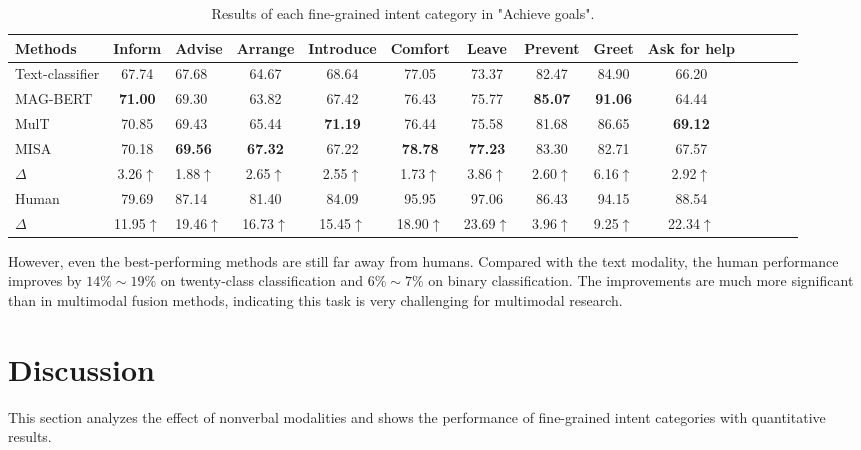 \documentclass[sigconf,camera-ready]{acmart}
\begin{document}
\begin{table*}\small
		\caption{\label{goal_results_each_class} Results of each fine-grained intent category in "Achieve goals".
	}
	\renewcommand\tabcolsep{3pt} 
	\centering
		\begin{tabular*}{\textwidth}{l|c@{\extracolsep{\fill}}lccccccccccc} 
		\midrule
		Methods & Inform  &Advise & Arrange & Introduce & Comfort & Leave & Prevent & Greet & Ask for help\\
		\midrule
		\multicolumn{1}{l|}{Text-classifier}  & 67.74 & 67.68 & 64.67 & 68.64 & 77.05 & 73.37 & 82.47 & 84.90 & 66.20   \\
		\midrule
		\multicolumn{1}{l|}{MAG-BERT}  & \textbf{71.00} & 69.30 & 63.82 & 67.42 & 76.43 & 75.77 & \textbf{85.07} & \textbf{91.06} & 64.44 \\
		\multicolumn{1}{l|}{MulT}  & 
        70.85 & 69.43 & 65.44 & \textbf{71.19} & 76.44 & 75.58 & 81.68 & 86.65 & \textbf{69.12} \\
		\multicolumn{1}{l|}{MISA} & 
		70.18 & \textbf{69.56} & \textbf{67.32} & 67.22 & \textbf{78.78} & \textbf{77.23} & 83.30 & 82.71 & 67.57   \\
		\multicolumn{1}{l|}{$\Delta$} & 3.26$\uparrow$ & 1.88$\uparrow$ & 2.65$\uparrow$ & 2.55$\uparrow$ & 1.73$\uparrow$ & 3.86$\uparrow$ & 2.60$\uparrow$ & 6.16$\uparrow$ & 2.92$\uparrow$ \\
		\midrule
		\multicolumn{1}{l|}{Human}  & 79.69 & 87.14 & 81.40 & 84.09 & 95.95 & 97.06 & 86.43 & 94.15 & 88.54 \\
		\multicolumn{1}{l|}{$\Delta$}  & 11.95$\uparrow$ & 19.46$\uparrow$ & 16.73$\uparrow$ & 15.45$\uparrow$ & 18.90$\uparrow$ & 23.69$\uparrow$ & 3.96$\uparrow$ & 9.25$\uparrow$ & 22.34$\uparrow$ \\
		\bottomrule
	\end{tabular*}
\end{table*}

However, even the best-performing methods are still far away from humans. Compared with the text modality, the human performance improves by $14\%\sim19\%$ on twenty-class classification and $6\%\sim7\%$ on binary classification. The improvements are much more significant than in multimodal fusion methods, indicating this task is very challenging for multimodal research. 


\section{Discussion}
This section analyzes the effect of nonverbal modalities and shows the performance of fine-grained intent categories with quantitative results.
\end{document}
